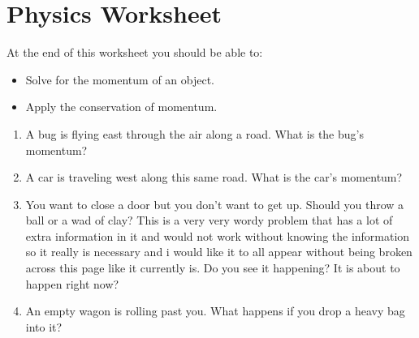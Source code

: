\documentclass[12pt]{article}
\begin{document}
	
	\section*{Physics Worksheet}
	
	At the end of this worksheet you should be able to:
	\begin{itemize}
		\item Solve for the momentum of an object.
		\item Apply the conservation of momentum.
	\end{itemize}
	
	\begin{enumerate}
		\item A bug is flying east through the air along a road. What is the bug’s momentum?
		
		\item A car is traveling west along this same road. What is the car’s momentum?
		
		\item You want to close a door but you don’t want to get up. Should you throw a ball or a wad of clay? This is a very very wordy problem that has a lot of extra information in it and would not work without knowing the information so it really is necessary and i would like it to all appear without being broken across this page like it currently is. Do you see it happening? It is about to happen right now?
		
		\item An empty wagon is rolling past you. What happens if you drop a heavy bag into it?
	\end{enumerate}
	
\end{document}

